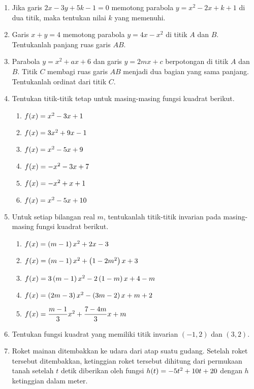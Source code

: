 \begin{enumerate}[topsep=0pt]
			\item Jika garis $ 2x - 3y + 5k - 1 = 0 $ memotong parabola $ y = x^{2} - 2x + k + 1 $ di dua titik, maka tentukan nilai $ k $ yang memenuhi.
			\item Garis $ x + y = 4 $ memotong parabola $ y = 4x - x^{2} $ di titik $ A $ dan $ B $. Tentukanlah panjang ruas garis $ AB $.
			\item Parabola $ y = x^{2} + ax + 6 $ dan garis $ y = 2mx + c $ berpotongan di titik $ A $ dan $ B $. Titik $ C $ membagi ruas garis $ AB $ menjadi dua bagian yang sama panjang. Tentukanlah ordinat dari titik $ C $.
			\item Tentukan titik-titik tetap untuk masing-masing fungsi kuadrat berikut.
			\begin{multcols}
				\begin{enumerate}
					\item $ \mathop{}\!{f}{\left({x}\right)} = x^{2} - 3x + 1 $
					\item $ \mathop{}\!{f}{\left({x}\right)} = 3x^{2} + 9x - 1 $
					\item $ \mathop{}\!{f}{\left({x}\right)} = x^{2} - 5x + 9 $
					\item $ \mathop{}\!{f}{\left({x}\right)} = -x^{2} - 3x + 7 $
					\item $ \mathop{}\!{f}{\left({x}\right)} = -x^{2} + x + 1 $
					\item $ \mathop{}\!{f}{\left({x}\right)} = x^{2} - 5x + 10 $
				\end{enumerate}
			\end{multcols}
			\item Untuk setiap bilangan real $ m $, tentukanlah titik-titik invarian pada masing-masing fungsi kuadrat berikut.
			\begin{enumerate}
				\item $ \mathop{}\!{f}{\left({x}\right)} = \left(m - 1\right)x^{2} + 2x - 3 $
				\item $ \mathop{}\!{f}{\left({x}\right)} = \left(m - 1\right)x^{2} + \left(1 - 2m^{2}\right)x + 3 $
				\item $ \mathop{}\!{f}{\left({x}\right)} = 3\left(m - 1\right)x^{2} - 2\left(1 - m\right)x + 4 - m $
				\item $ \mathop{}\!{f}{\left({x}\right)} = \left(2m - 3\right)x^{2} - \left(3m - 2\right)x + m + 2 $
				\item $ \mathop{}\!{f}{\left({x}\right)} = \dfrac{m - 1}{3}x^{2} + \dfrac{7 - 4m}{3}x + m $
			\end{enumerate}
			\item Tentukan fungsi kuadrat yang memiliki titik invarian $ \left(-1, 2\right) $ dan $ \left(3, 2\right) $.
			\item Roket mainan ditembakkan ke udara dari atap suatu gudang. Setelah roket tersebut ditembakkan, ketinggian roket tersebut dihitung dari permukaan tanah setelah $ t $ detik diberikan oleh fungsi $ \mathop{}\!{h}{\left({t}\right)} = -5t^{2} + 10t + 20 $ dengan $ h $ ketinggian dalam meter.

\end{enumerate}
